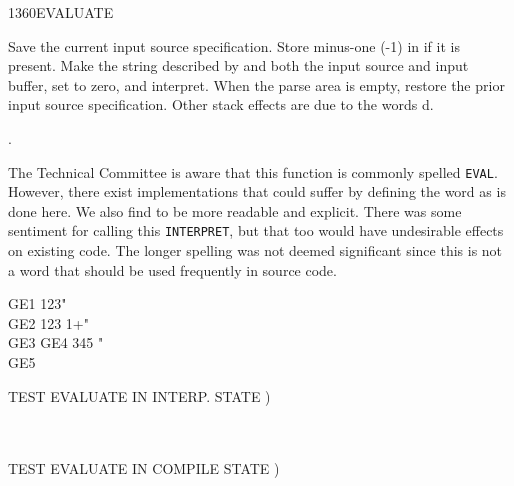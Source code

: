 \begin{worddef}{1360}{EVALUATE}
\item {}

	Save the current input source specification. Store minus-one
	(-1) in  if it is present. Make the string
	described by  and  both the input source
	and input buffer, set  to zero, and interpret. When
	the parse area is empty, restore the prior input source
	specification. Other stack effects are due to the words
	d.

\see {}.

	\begin{rationale} %
		The Technical Committee is aware that this function is
		commonly spelled \texttt{EVAL}. However, there exist
		implementations that could suffer by defining the word as is
		done here. We also find  to be more readable
		and explicit. There was some sentiment for calling this
		\texttt{INTERPRET}, but that too would have undesirable
		effects on existing code. The longer spelling was not deemed
		significant since this is not a word that should be used
		frequently in source code.
	\end{rationale}

	\begin{testing} %
		\ttfamily
		\word{:} GE1  123" \word{;}  \\
		\word{:} GE2  123 1+" \word{;}  \\
		\word{:} GE3  \word{:} GE4 345 \word{;}" \word{;} \\
		\word{:} GE5  \word{;} 

		  TEST EVALUATE IN INTERP. STATE ) \\
		 \\
		 \\

		  TEST EVALUATE IN COMPILE STATE ) \\
		 \\
		 \\

	\end{testing}
\end{worddef}


